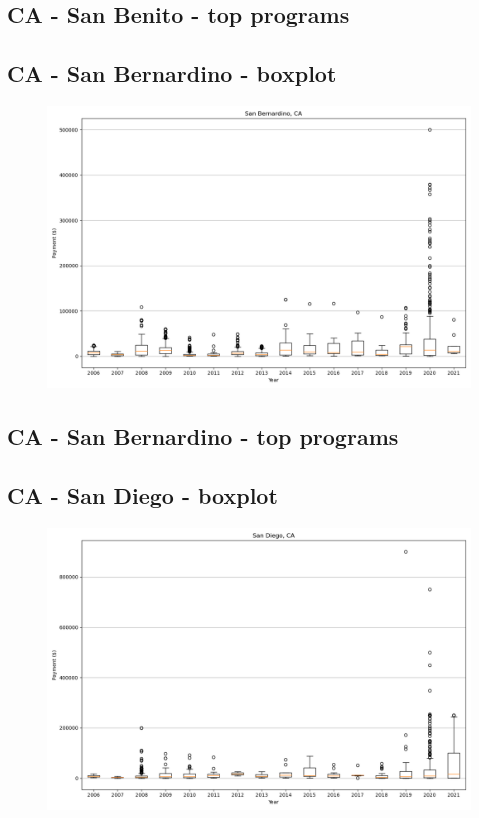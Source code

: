 \subsection*{CA - San Benito - top programs}

\newpage
\subsection*{CA - San Bernardino - boxplot}
\begin{figure}[h]
\centering
\includegraphics[width=7in]{../output/boxplots/counties/San Bernardino-CA_boxplot.png}
\end{figure}


\subsection*{CA - San Bernardino - top programs}

\newpage
\subsection*{CA - San Diego - boxplot}
\begin{figure}[h]
\centering
\includegraphics[width=7in]{../output/boxplots/counties/San Diego-CA_boxplot.png}
\end{figure}


